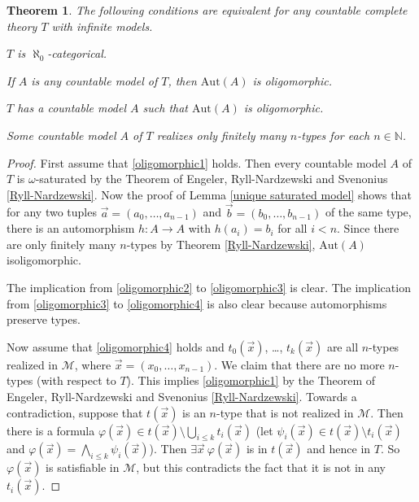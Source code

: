 \documentclass[10pt]{amsart}
\newcommand{\NNN}{\mathbb{N}}
\newcommand{\MM}{\mathcal{M}}
\newcommand{\Aut}{\mathrm{Aut}}
\newtheorem{theorem}{Theorem}[subsection]
\theoremstyle{definition}
\theoremstyle{remark}
\newenvironment{enumerate-(a)}{\begin{enumerate}[label={\upshape (\alph*)}, leftmargin=2pc]}{\end{enumerate}}
\begin{document}
\begin{theorem} \label{oligomorphic groups and categoricity}
The following conditions are equivalent for any countable complete theory $T$ with infinite models. 
\begin{enumerate-(a)} 
\item \label{oligomorphic1}
$T$ is $\aleph_0$-categorical. 
\item \label{oligomorphic2}
If $A$ is any countable model of $T$, then $\Aut(A)$ is oligomorphic. 
\item \label{oligomorphic3}
$T$ has a countable model $A$ such that $\Aut(A)$ is oligomorphic. 
\item \label{oligomorphic4}
Some countable model $A$ of $T$ realizes only finitely many $n$-types for each $n\in\NNN$. 
\end{enumerate-(a)} 
\end{theorem} 
\begin{proof} 
First assume that \ref{oligomorphic1} holds. Then every countable model $A$ of $T$ is $\omega$-saturated by the Theorem of Engeler, Ryll-Nardzewski and Svenonius \ref{Ryll-Nardzewski}. 
Now the proof of Lemma \ref{unique saturated model} shows that for any two tuples $\vec{a}=(a_0,\dots,a_{n-1})$ and $\vec{b}=(b_0,\dots,b_{n-1})$ of the same type, there is an automorphism $h\colon A\rightarrow A$ with $h(a_i)=b_i$ for all $i<n$. Since there are only finitely many $n$-types by Theorem \ref{Ryll-Nardzewski}, $\Aut(A)$ isoligomorphic. 

The implication from \ref{oligomorphic2} to \ref{oligomorphic3} is clear. The implication from \ref{oligomorphic3} to \ref{oligomorphic4} is also clear because automorphisms preserve types. 

Now assume that \ref{oligomorphic4} holds and $t_0(\vec{x})$, \dots, $t_k(\vec{x})$ are all $n$-types realized in $\MM$, where $\vec{x}=(x_0,\dots,x_{n-1})$. 
We claim that there are no more $n$-types (with respect to $T$). This implies \ref{oligomorphic1} by the Theorem of Engeler, Ryll-Nardzewski and Svenonius \ref{Ryll-Nardzewski}. 
Towards a contradiction, suppose that $t(\vec{x})$ is an $n$-type that is not realized in $\MM$. Then there is a formula $\varphi(\vec{x})\in t(\vec{x})\setminus \bigcup_{i\leq k} t_i(\vec{x})$ (let $\psi_i(\vec{x})\in t(\vec{x})\setminus t_i(\vec{x})$ and $\varphi(\vec{x})=\bigwedge_{i\leq k}\psi_i(\vec{x})$). Then $\exists \vec{x}\ \varphi(\vec{x})$ is in $t(\vec{x})$ and hence in $T$. So $\varphi(\vec{x})$ is satisfiable in $\MM$, but this contradicts the fact that it is not in any $t_i(\vec{x})$. 
\end{proof} 
\end{document}
